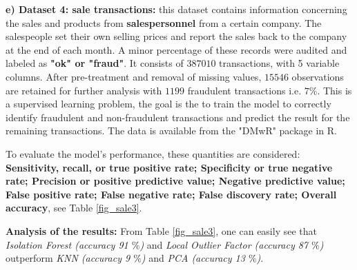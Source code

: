 \noindent \textbf{e) Dataset 4: sale transactions:} this dataset contains information concerning the sales and products from \textbf{salespersonnel} from a certain company. The salespeople set their own selling prices and report the sales back to the company at the end of each month. A minor percentage of these records were audited and labeled as \textbf{"ok" or "fraud"}. It consists of $387010$ transactions, with 5 variable columns. After pre-treatment and removal of missing values, $15546$ observations are retained for further analysis with $1199$ fraudulent transactions i.e. $7 \%$. This is a supervised learning problem, the goal is the to train the model to correctly identify fraudulent and non-fraudulent transactions and predict the result for the remaining transactions. The data is available from the "DMwR" package in R.  

To evaluate the model's performance, these quantities are considered: \textbf{
Sensitivity, recall, or true positive rate; Specificity or true negative rate; Precision or positive predictive value; Negative predictive value; False positive rate; False negative rate; False discovery rate; Overall accuracy}, see Table \ref{fig_sale3}.

\noindent\textbf{Analysis of the results:} From Table \eqref{fig_sale3}, one can easily see that \textit{Isolation Forest (accuracy 91 $\%$)} and \textit{Local Outlier Factor (accuracy 87 $\%$)} outperform \textit{KNN (accuracy 9 $\%$)} and \textit{PCA (accuracy 13 $\%$)}.

